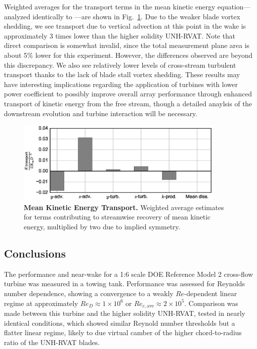 \documentclass[10pt,letterpaper]{article}
\begin{document}
Weighted averages for the transport terms in the mean kinetic energy
equation---analyzed identically to \cite{Bachant2015-JoT}---are shown in
Fig.~\ref{fig:Ktransport}. Due to the weaker blade vortex shedding, we see
transport due to vertical advection at this point in the wake is approximately 3
times lower than the higher solidity UNH-RVAT. Note that direct comparison is
somewhat invalid, since the total measurement plane area is about 5\% lower for
this experiment. However, the differences observed are beyond this discrepancy.
We also see relatively lower levels of cross-stream turbulent transport thanks
to the lack of blade stall vortex shedding. These results may have interesting
implications regarding the application of turbines with lower power coefficient
to possibly improve overall array performance through enhanced transport of
kinetic energy from the free stream, though a detailed anaylsis of the
downstream evolution and turbine interaction will be necessary.

\begin{figure}[ht!]
    \includegraphics[width=0.9\textwidth]{figures/K_trans_bar_graph.eps}

    \caption{{\bf Mean Kinetic Energy Transport.} Weighted average estimates for
    terms contributing to streamwise recovery of mean kinetic energy, multiplied
    by two due to implied symmetry.}

    \label{fig:Ktransport}
\end{figure}


\subsection*{Conclusions}

The performance and near-wake for a 1:6 scale DOE Reference Model 2 cross-flow
turbine was measured in a towing tank. Performance was assessed for Reynolds
number dependence, showing a convergence to a weakly $Re$-dependent linear
regime at approximately $Re_D \approx 1 \times 10^6$ or $Re_{c,\mathrm{ave}}
\approx 2 \times 10^5$. Comparison was made between this turbine and the higher
solidity UNH-RVAT, tested in nearly identical conditions, which showed similar
Reynold number thresholds but a flatter linear regime, likely to due virtual
camber of the higher chord-to-radius ratio of the UNH-RVAT blades.
\end{document}
